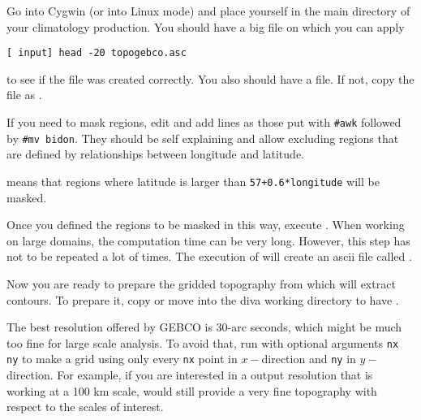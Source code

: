 %
%
%
%

Go into Cygwin (or into Linux mode) and place yourself in the main directory of your climatology production. You should have a big  file on which you can apply

\begin{lstlisting}[style=Bash]
[ input] head -20 topogebco.asc
\end{lstlisting}

to see if the file was created correctly. You also should have a  file. If not, copy the  file as .

If you need to mask regions, edit  and add lines as those put with {\tt \#awk} followed by {\tt \#mv bidon}. They should be self explaining and allow excluding regions that are defined by relationships between longitude and latitude. 

 means that regions where latitude is larger than \texttt{57+0.6*longitude} will be masked.

Once you defined the regions to be masked in this way, execute . When working on large domains, the computation time can be very long. However, this step has not to be repeated a lot of times. The execution of  will create an ascii file called 
.

Now you are ready to prepare the gridded topography  from which \diva will extract contours. To prepare it,
copy or move  into the diva working directory to have .

The best resolution offered by GEBCO is 30-arc seconds, which might be much too fine for large scale analysis. To avoid that, run
 with optional arguments {\tt nx ny} to make a grid using only every {\tt nx} point in $x-$direction and {\tt ny} in $y-$direction. For example, if you are interested in a \diva output resolution that is working at a 100 km scale,  would still provide a very fine topography with respect to the scales of interest.


